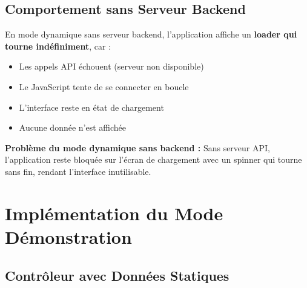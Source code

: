 \documentclass[12pt,a4paper]{report}
\begin{document}
\subsection{Comportement sans Serveur Backend}

En mode dynamique sans serveur backend, l'application affiche un \textbf{loader qui tourne indéfiniment}, car :

\begin{itemize}
    \item Les appels API échouent (serveur non disponible)
    \item Le JavaScript tente de se connecter en boucle
    \item L'interface reste en état de chargement
    \item Aucune donnée n'est affichée
\end{itemize}

\begin{warningbox}
\textbf{Problème du mode dynamique sans backend :}
Sans serveur API, l'application reste bloquée sur l'écran de chargement avec un spinner qui tourne sans fin, rendant l'interface inutilisable.
\end{warningbox}

\section{Implémentation du Mode Démonstration}

\subsection{Contrôleur avec Données Statiques}
\end{document}
